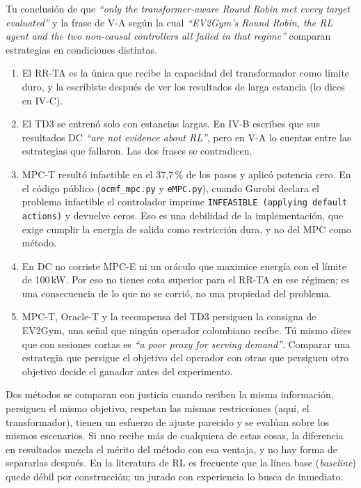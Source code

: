 \documentclass[11pt]{article}
\begin{document}
\begin{error}
Tu conclusión de que \foreignlanguage{english}{\emph{``only the transformer-aware Round Robin met every target evaluated''}} y la frase de V-A según la cual \foreignlanguage{english}{\emph{``EV2Gym's Round Robin, the RL agent and the two non-causal controllers all failed in that regime''}} comparan estrategias en condiciones distintas.
\begin{enumerate}[label=(\alph*),leftmargin=1.5em]
\item El RR-TA es la única que recibe la capacidad del transformador como límite duro, y la escribiste después de ver los resultados de larga estancia (lo dices en IV-C).
\item El TD3 se entrenó solo con estancias largas. En IV-B escribes que sus resultados DC \foreignlanguage{english}{\emph{``are not evidence about RL''}}, pero en V-A lo cuentas entre las estrategias que fallaron. Las dos frases se contradicen.
\item MPC-T resultó infactible en el 37,7\,\% de los pasos y aplicó potencia cero. En el código público (\texttt{ocmf\_mpc.py} y \texttt{eMPC.py}), cuando Gurobi declara el problema infactible el controlador imprime \texttt{INFEASIBLE (applying default actions)} y devuelve ceros. Eso es una debilidad de la implementación, que exige cumplir la energía de salida como restricción dura, y no del MPC como método.
\item En DC no corriste MPC-E ni un oráculo que maximice energía con el límite de 100\,kW. Por eso no tienes cota superior para el RR-TA en ese régimen; es una consecuencia de lo que no se corrió, no una propiedad del problema.
\item MPC-T, Oracle-T y la recompensa del TD3 persiguen la consigna de EV2Gym, una señal que ningún operador colombiano recibe. Tú mismo dices que con sesiones cortas es \foreignlanguage{english}{\emph{``a poor proxy for serving demand''}}. Comparar una estrategia que persigue el objetivo del operador con otras que persiguen otro objetivo decide el ganador antes del experimento.
\end{enumerate}
\end{error}

\begin{idea}
Dos métodos se comparan con justicia cuando reciben la misma información, persiguen el mismo objetivo, respetan las mismas restricciones (aquí, el transformador), tienen un esfuerzo de ajuste parecido y se evalúan sobre los mismos escenarios. Si uno recibe más de cualquiera de estas cosas, la diferencia en resultados mezcla el mérito del método con esa ventaja, y no hay forma de separarlas después. En la literatura de RL es frecuente que la línea base (\emph{baseline}) quede débil por construcción; un jurado con experiencia lo busca de inmediato.
\end{idea}
\end{document}
